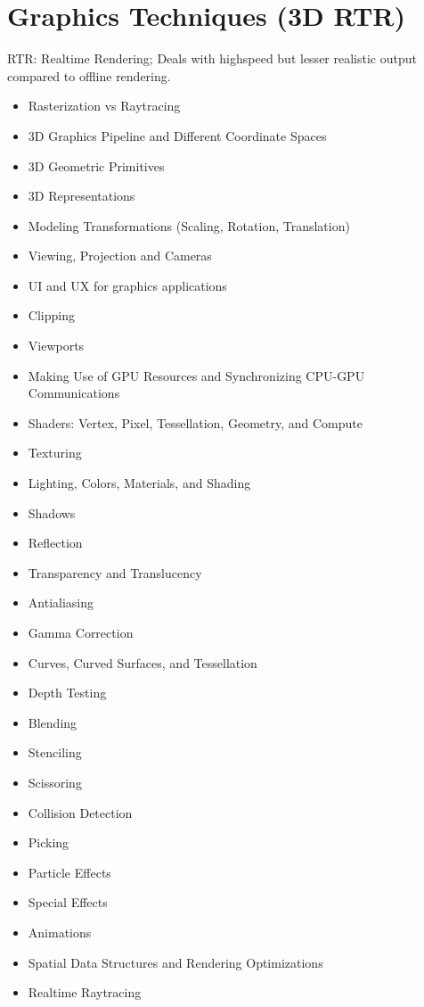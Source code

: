 \section{Graphics Techniques (3D RTR)}
RTR: Realtime Rendering; Deals with highspeed but lesser realistic output compared to offline rendering.
\begin{itemize}
    \item Rasterization vs Raytracing
    \item 3D Graphics Pipeline and Different Coordinate Spaces
    \item 3D Geometric Primitives
    \item 3D Representations
    \item Modeling Transformations (Scaling, Rotation, Translation)
    \item Viewing, Projection and Cameras
    \item UI and UX for graphics applications
    \item Clipping
    \item Viewports
    \item Making Use of GPU Resources and Synchronizing CPU-GPU Communications
    \item Shaders: Vertex, Pixel, Tessellation, Geometry, and Compute
    \item Texturing
    \item Lighting, Colors, Materials, and Shading
    \item Shadows
    \item Reflection
    \item Transparency and Translucency
    \item Antialiasing
    \item Gamma Correction
    \item Curves, Curved Surfaces, and Tessellation
    \item Depth Testing
    \item Blending
    \item Stenciling
    \item Scissoring
    \item Collision Detection
    \item Picking
    \item Particle Effects
    \item Special Effects
    \item Animations
    \item Spatial Data Structures and Rendering Optimizations
    \item Realtime Raytracing
\end{itemize}

